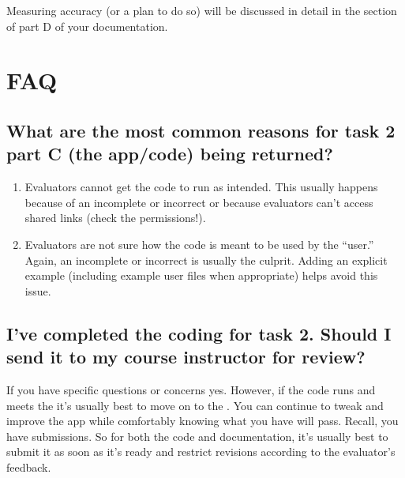 \documentclass[letterpaper,10pt,english]{jupyterBook}
\begin{document}
\sphinxAtStartPar
Measuring accuracy (or a plan to do so) will be discussed in detail in the  section of part D of your documentation.


\section{FAQ}
\label{\detokenize{task2_c/task2_part_c:faq}}\label{\detokenize{task2_c/task2_part_c:task2c-faq}}

\subsection{What are the most common reasons for task 2 part C (the app/code) being returned?}
\label{\detokenize{task2_c/task2_part_c:what-are-the-most-common-reasons-for-task-2-part-c-the-app-code-being-returned}}\begin{enumerate}
%
\item {} 
\sphinxAtStartPar
Evaluators cannot get the code to run as intended. This usually happens because of an incomplete or incorrect {\hyperref[\detokenize{task2_doc/task2_doc_d:task2-doc-d-user-guide}]{}} or because evaluators can’t access shared links (check the permissions!).

\item {} 
\sphinxAtStartPar
Evaluators are not sure how the code is meant to be used by the “user.” Again, an incomplete or incorrect {\hyperref[\detokenize{task2_doc/task2_doc_d:task2-doc-d-user-guide}]{}} is usually the culprit. Adding an explicit example (including example user files when appropriate) helps avoid this issue.

\end{enumerate}


\subsection{I’ve completed the coding for task 2. Should I send it to my course instructor for review?}
\label{\detokenize{task2_c/task2_part_c:i-ve-completed-the-coding-for-task-2-should-i-send-it-to-my-course-instructor-for-review}}
\sphinxAtStartPar
If you have specific questions or concerns \sphinxhyphen{}yes. However, if the code runs and meets the  it’s usually best to move on to the {\hyperref[\detokenize{task2_doc/task2_doc:task2-doc}]{}}. You can continue to tweak and improve the app while comfortably knowing what you have will pass. Recall, you have  submissions. So for both the code and documentation, it’s usually best to submit it as soon as it’s ready and restrict revisions according to the evaluator’s feedback.
\end{document}
